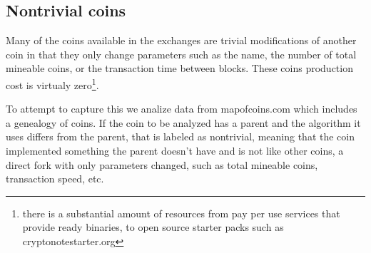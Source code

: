 \subsection{Nontrivial coins}

Many of the coins available in the exchanges are trivial modifications of another coin in that they only change parameters such as the name, the number of total mineable coins, or the transaction time between blocks.
These coins production cost is virtualy zero\footnote{ there is a substantial amount of resources from pay per use services that provide ready binaries, to open source starter packs such as cryptonotestarter.org}.

To attempt to capture this we analize data from mapofcoins.com which includes a genealogy of coins.
If the coin to be analyzed has a parent and the algorithm it uses differs from the parent, that is labeled as nontrivial, meaning that the coin implemented something the parent doesn't have and is not like other coins, a direct fork with only parameters changed, such as total mineable coins, transaction speed, etc.

